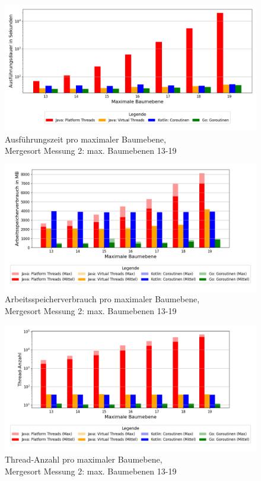 \documentclass[fontsize=12pt,paper=a4,twoside=semi,parskip=half-,headsepline,headinclude]{scrreprt}
\begin{document}
\begin{figure}[H]
	\centering
	\includegraphics[scale=0.5]{figures/mergesort/Maximalebauebenen1-19_pvcg/execution_time_plot.png}
	\caption{Ausführungszeit pro maximaler Baumebene,\\ Mergesort Messung 2: max. Baumebenen 13-19}
	\label{fig:ms1-19Zeit}
\end{figure}

\begin{figure}[H]
	\centering
	\includegraphics[scale=0.5]{figures/mergesort/Maximalebauebenen1-19_pvcg/memory_usage_bar_plot.png}
	\caption{Arbeitsspeicherverbrauch pro maximaler Baumebene,\\ Mergesort Messung 2: max. Baumebenen 13-19}
	\label{fig:ms1-19RAM}
\end{figure}

\begin{figure}[H]
	\centering
	\includegraphics[scale=0.5]{figures/mergesort/Maximalebauebenen1-19_pvcg/num_threads_bar_plot.png}
	\caption{Thread-Anzahl pro maximaler Baumebene,\\ Mergesort Messung 2: max. Baumebenen 13-19}
	\label{fig:ms1-19Threads}
\end{figure}
\end{document}
